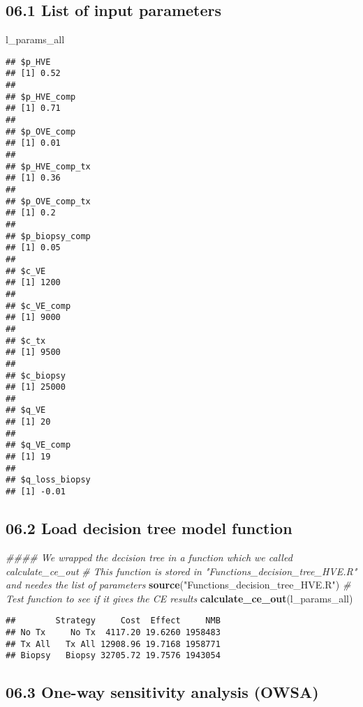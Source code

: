 \documentclass[
]{article}
\newenvironment{Shaded}{\begin{snugshade}}{\end{snugshade}}
\newcommand{\CommentTok}[1]{\textcolor[rgb]{0.56,0.35,0.01}{\textit{#1}}}
\newcommand{\KeywordTok}[1]{\textcolor[rgb]{0.13,0.29,0.53}{\textbf{#1}}}
\newcommand{\NormalTok}[1]{#1}
\newcommand{\StringTok}[1]{\textcolor[rgb]{0.31,0.60,0.02}{#1}}
\begin{document}
\hypertarget{list-of-input-parameters}{%
\subsection{06.1 List of input
parameters}\label{list-of-input-parameters}}

\begin{Shaded}
\begin{Highlighting}[]
\NormalTok{l_params_all }
\end{Highlighting}
\end{Shaded}

\begin{verbatim}
## $p_HVE
## [1] 0.52
## 
## $p_HVE_comp
## [1] 0.71
## 
## $p_OVE_comp
## [1] 0.01
## 
## $p_HVE_comp_tx
## [1] 0.36
## 
## $p_OVE_comp_tx
## [1] 0.2
## 
## $p_biopsy_comp
## [1] 0.05
## 
## $c_VE
## [1] 1200
## 
## $c_VE_comp
## [1] 9000
## 
## $c_tx
## [1] 9500
## 
## $c_biopsy
## [1] 25000
## 
## $q_VE
## [1] 20
## 
## $q_VE_comp
## [1] 19
## 
## $q_loss_biopsy
## [1] -0.01
\end{verbatim}

\hypertarget{load-decision-tree-model-function}{%
\subsection{06.2 Load decision tree model
function}\label{load-decision-tree-model-function}}

\begin{Shaded}
\begin{Highlighting}[]
\CommentTok{#### We wrapped the decision tree in a function which we called calculate_ce_out }
\CommentTok{# This function is stored in "Functions_decision_tree_HVE.R" and needes the list of parameters}
\KeywordTok{source}\NormalTok{(}\StringTok{"Functions_decision_tree_HVE.R"}\NormalTok{)}
\CommentTok{# Test function to see if it gives the CE results}
\KeywordTok{calculate_ce_out}\NormalTok{(l_params_all)}
\end{Highlighting}
\end{Shaded}

\begin{verbatim}
##        Strategy     Cost  Effect     NMB
## No Tx     No Tx  4117.20 19.6260 1958483
## Tx All   Tx All 12908.96 19.7168 1958771
## Biopsy   Biopsy 32705.72 19.7576 1943054
\end{verbatim}

\hypertarget{one-way-sensitivity-analysis-owsa}{%
\subsection{06.3 One-way sensitivity analysis
(OWSA)}\label{one-way-sensitivity-analysis-owsa}}
\end{document}
